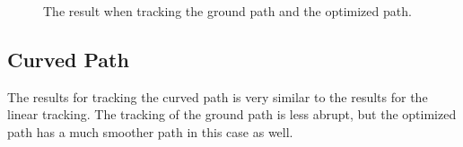 \begin{figure}
	\caption{The result when tracking the ground path and the optimized path.}
	\label{fig:lin_sim_res}
\end{figure}


\subsection{Curved Path}

The results for tracking the curved path is very similar to the results for the linear tracking. The tracking of the ground path is less abrupt, but the optimized path has a much smoother path in this case as well. 

